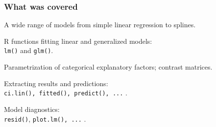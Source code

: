\documentclass[12pt,dvipsnames,t,handout%
,aspectratio=169%
]{beamer}
\begin{document}
% 
\begin{frame}
\frametitle{What was covered}

\bi
\item A wide range of models from simple linear regression to splines.
\medskip
\item
R functions fitting linear and generalized models: \\ \texttt{lm()} and \texttt{glm()}.
\medskip
\item
Parametrization of categorical explanatory factors; contrast matrices.
\medskip
\item
Extracting results and predictions: \\ \texttt{ci.lin(), fitted(), predict(), ...} . 
\medskip
\item
Model diagnostics: \\ \texttt{resid()}, \texttt{plot.lm(), ...} .
\ei

\end{frame}
\end{document}
